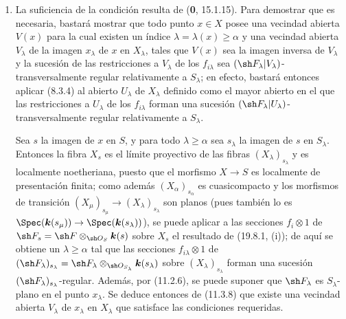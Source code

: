 \begin{enumerate}
  \item[(i)] La suficiencia de la condición resulta de (\textbf{0}, 15.1.15). Para demostrar que es necesaria, bastará mostrar que todo punto $x\in X$ posee una vecindad abierta $V(x)$ para la cual existen un índice $\lambda=\lambda(x)\geq\alpha$ y una vecindad abierta $V_\lambda$ de la imagen $x_\lambda$ de $x$ en $X_\lambda$, tales que $V(x)$ sea la imagen inversa de $V_\lambda$ y la sucesión de las restricciones a $V_\lambda$ de los $f_{i\lambda}$ sea $(\sh F_\lambda|V_\lambda)$-transversalmente regular relativamente a $S_\lambda$; en efecto, bastará entonces aplicar (8.3.4) al abierto $U_\lambda$ de $X_\lambda$ definido como el mayor abierto en el que las restricciones a $U_\lambda$ de los $f_{i\lambda}$ forman una sucesión $(\sh F_\lambda|U_\lambda)$-transversalmente regular relativamente a $S_\lambda$.

  Sea $s$ la imagen de $x$ en $S$, y para todo $\lambda\geq\alpha$ sea $s_\lambda$ la imagen de $s$ en $S_\lambda$. Entonces la fibra $X_s$ es el límite proyectivo de las fibras $(X_\lambda)_{s_\lambda}$ y es localmente noetheriana, puesto que el morfismo $X\to S$ es localmente de presentación finita; como además $(X_\alpha)_{s_\alpha}$ es cuasicompacto y los morfismos de transición $(X_\mu)_{s_\mu}\to(X_\lambda)_{s_\lambda}$ son planos (pues también lo es $\Spec(\boldsymbol{k}(s_\mu))\to\Spec(\boldsymbol{k}(s_\lambda))$), se puede aplicar a las secciones $f_i\otimes1$ de $\sh F_s=\sh F\otimes_{\sh O_S}\boldsymbol{k}(s)$ sobre $X_s$ el resultado de (19.8.1, (i)); de aquí se obtiene un $\lambda\geq\alpha$ tal que las secciones $f_{i\lambda}\otimes1$ de $(\sh F_\lambda)_{s_\lambda}=\sh F_\lambda\otimes_{\sh O_{S_\lambda}}\boldsymbol{k}(s_\lambda)$ sobre $(X_\lambda)_{s_\lambda}$ forman una sucesión $(\sh F_\lambda)_{s_\lambda}$-regular. Además, por (11.2.6), se puede suponer que $\sh F_\lambda$ es $S_\lambda$-plano en el punto $x_\lambda$. Se deduce entonces de (11.3.8) que existe una vecindad abierta $V_\lambda$ de $x_\lambda$ en $X_\lambda$ que satisface las condiciones requeridas.


\end{enumerate}
